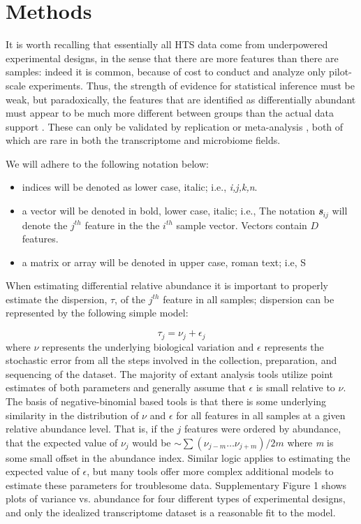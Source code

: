 \documentclass{bmcart}
\begin{document}
\section*{Methods}


It is worth recalling that essentially all HTS data come from underpowered experimental designs, in the sense that there are more features than there are samples: indeed it is common, because of cost to conduct and analyze only pilot-scale experiments. Thus, the strength of evidence for statistical inference must be weak, but paradoxically, the features that are identified as differentially abundant must appear to be much more different between groups than the actual data support  \cite{Halsey:2015aa}. These can only be validated by replication or meta-analysis \cite{Cumming:2008aa}, both of which are rare in both the transcriptome and microbiome fields. 

We will adhere to the following notation below:
\begin{itemize}
\item{indices} will be denoted as lower case, italic; i.e., \textit{i,j,k,n}. 
\item{a vector} will be denoted in bold, lower case, italic; i.e., The notation \textit{\textbf{s$_{ij}$}} will denote the $j^{th}$ feature in the the $i^{th}$ sample vector. Vectors contain $D$ features. 
\item{a matrix or array} will be denoted in upper case, roman text; i.e, S
\end{itemize}


When estimating differential relative abundance it is important to properly estimate the dispersion, $\tau$, of the $j^{th}$ feature in all samples; dispersion can be represented by the following simple model:

\begin{equation}
    \tau_{j} = \nu_j + \epsilon_j
\label{eq:dispersion}
\end{equation} 
where $\nu$ represents the underlying biological variation and $\epsilon$ represents the stochastic error  from all the steps involved in the collection, preparation, and sequencing of the dataset. The majority of extant analysis tools utilize point estimates of both parameters and generally assume that  $\epsilon$ is small relative to $\nu$.  The basis of negative-binomial based tools is that there is some underlying similarity in the distribution of $\nu$ and $\epsilon$  for all features in all samples at a given relative abundance level. That is, if the $j$ features were ordered by abundance, that the expected value of $\nu_j$ would be  $\sim \sum (\nu_{j-m}\ldots \nu_{j+m}) / 2m $ where \textit{m} is some small offset in the abundance index. Similar logic applies to estimating the expected value of $\epsilon$, but many tools offer  more complex additional models to estimate these parameters for troublesome data. Supplementary Figure 1 shows plots of variance vs. abundance for four different types of experimental designs, and only the idealized transcriptome dataset is a reasonable fit to the model. 
\end{document}

